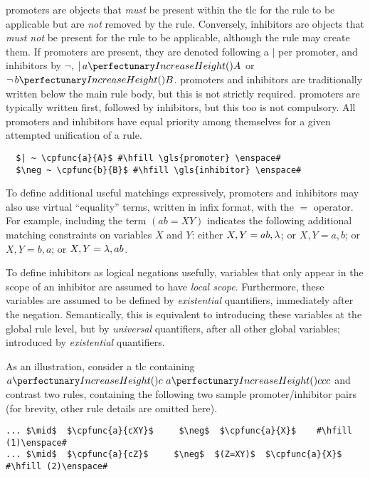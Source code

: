 \Glspl{promoter} are objects that \emph{must} be present within the \gls{tlc} for the rule to be applicable but are \emph{not} removed by the rule.  Conversely, \glspl{inhibitor} are objects that \emph{must not} be present for the rule to be applicable, although the rule may create them.  If \glspl{promoter} are present, they are denoted following a \(|\) per \gls{promoter}, and \glspl{inhibitor} by \(\neg\), \eg{} \(|\,\cpfunc{a}{A}\) or \(\neg\,\cpfunc{b}{B}\).  \Glspl{promoter} and \glspl{inhibitor} are traditionally written below the main rule body, but this is not strictly required.  \Glspl{promoter} are typically written first, followed by \glspl{inhibitor}, but this too is not compulsory.  All \glspl{promoter} and \glspl{inhibitor} have equal priority among themselves for a given attempted unification of a rule.

\lstset{xleftmargin=.5in, xrightmargin=.5in} 
\begin{lstlisting}
  $| ~ \cpfunc{a}{A}$ #\hfill \gls{promoter} \enspace#
  $\neg ~ \cpfunc{b}{B}$ #\hfill \gls{inhibitor} \enspace#
\end{lstlisting}

To define additional useful matchings expressively, 
\glspl{promoter} and \glspl{inhibitor} may also use virtual ``equality'' terms, 
written in infix format, with the \(=\) operator.
For example, including the term \((ab = XY)\) indicates the following additional matching constraints on variables \(X\) and \(Y\): either \(X, Y = ab, \lambda\); or \(X, Y = a, b\); or \(X, Y = b, a\); or \(X, Y = \lambda, ab\).

To define \glspl{inhibitor} as logical negations usefully,
variables that only appear in the scope of an \gls{inhibitor} are assumed to have \emph{local scope}. 
Furthermore, these variables are assumed to be defined by \emph{existential} quantifiers, immediately after the negation. 
Semantically, this is equivalent to introducing these variables at the global rule level, 
but by \emph{universal} quantifiers, after all other global variables;
introduced by \emph{existential} quantifiers.

As an illustration, consider a \gls{tlc} containing \(\cpfunc{a}{c} ~ \cpfunc{a}{ccc}\) and contrast two rules, 
containing the following two sample \gls{promoter}/\gls{inhibitor} pairs 
(for brevity, other rule details are omitted here).

\lstset{xleftmargin=.5in, xrightmargin=.5in} 
\begin{lstlisting}
... $\mid$  $\cpfunc{a}{cXY}$     $\neg$  $\cpfunc{a}{X}$    #\hfill (1)\enspace#
... $\mid$  $\cpfunc{a}{cZ}$     $\neg$  $(Z=XY)$  $\cpfunc{a}{X}$    #\hfill (2)\enspace#
\end{lstlisting}


